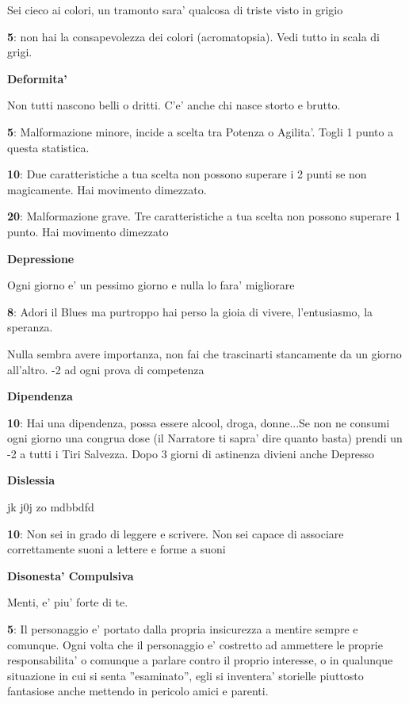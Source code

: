 \documentclass[a4paper,11pt,twoside,openany]{book}
\begin{document}
{Sei cieco ai colori, un tramonto sara' qualcosa di triste visto in grigio

\textbf{5}: non hai la consapevolezza dei colori (acromatopsia). Vedi tutto in scala di grigi.

\textbf{Deformita'}

Non tutti nascono belli o dritti. C'e' anche chi nasce storto e brutto.

\textbf{5}: Malformazione minore, incide a scelta tra Potenza o Agilita'. Togli 1 punto a questa statistica.

\textbf{10}: Due caratteristiche a tua scelta non possono superare i 2 punti se non magicamente. Hai movimento dimezzato.

\textbf{20}: Malformazione grave. Tre caratteristiche a tua scelta non possono superare 1 punto. Hai movimento dimezzato

\textbf{Depressione}

Ogni giorno e' un pessimo giorno e nulla lo fara' migliorare

\textbf{8}: Adori il Blues ma purtroppo hai perso la gioia di vivere, l'entusiasmo, la speranza.

Nulla sembra avere importanza, non fai che trascinarti stancamente da un giorno all'altro. -2 ad ogni prova di competenza

\textbf{Dipendenza}

\textbf{10}: Hai una dipendenza, possa essere alcool, droga, donne...Se non ne consumi ogni giorno una congrua dose (il Narratore ti sapra' dire quanto basta) prendi un -2 a tutti i Tiri Salvezza. Dopo 3 giorni di astinenza divieni anche Depresso

\textbf{Dislessia}

jk j0j zo mdbbdfd

\textbf{10}: Non sei in grado di leggere e scrivere. Non sei capace di associare correttamente suoni a lettere e forme a suoni

\textbf{Disonesta' Compulsiva}

Menti, e' piu' forte di te.

\textbf{5}: Il personaggio e' portato dalla propria insicurezza a mentire sempre e comunque. Ogni volta che il personaggio e' costretto ad ammettere le proprie responsabilita' o comunque a parlare contro il proprio interesse, o in qualunque situazione in cui si senta ''esaminato'', egli si inventera' storielle piuttosto fantasiose anche mettendo in pericolo amici e parenti.

}
\end{document}
